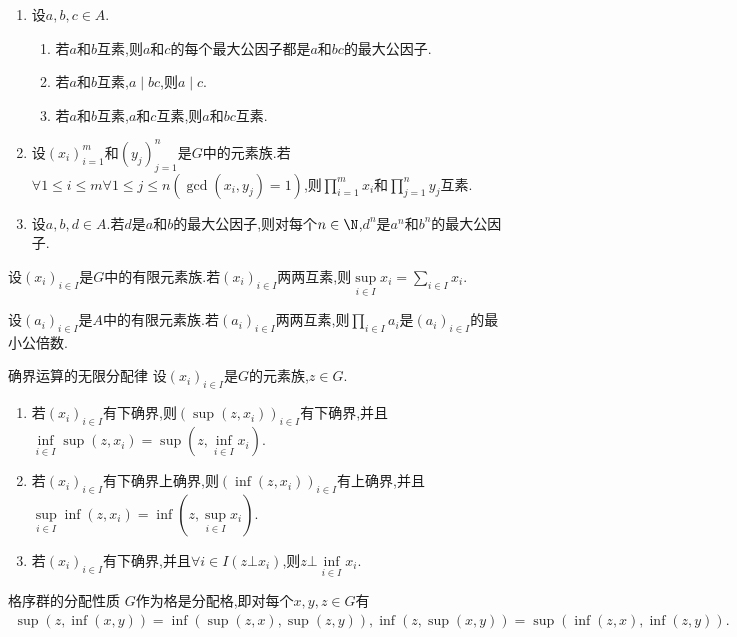 \begin{corollary}{}{}
	\begin{enumerate}
		\item 设$a,b,c\in A$.
		\begin{enumerate}
			\item 若$a$和$b$互素,则$a$和$c$的每个最大公因子都是$a$和$bc$的最大公因子.
			\item 若$a$和$b$互素,$a\mid bc$,则$a\mid c$.
			\item 若$a$和$b$互素,$a$和$c$互素,则$a$和$bc$互素.
		\end{enumerate}
		\item 设$\left(x_{i}\right)_{i=1}^{m}$和$\left(y_{j}\right)_{j=1}^{n}$是$G$中的元素族.若$\forall 1\leq i\leq m\forall 1\leq j\leq n\left(\gcd\left(x_{i},y_{j}\right)=1\right)$,则$\prod\limits_{i=1}^{m}x_{i}$和$\prod\limits_{j=1}^{n}y_{j}$互素.
		\item 设$a,b,d\in A$.若$d$是$a$和$b$的最大公因子,则对每个$n\in\N$,$d^{n}$是$a^{n}$和$b^{n}$的最大公因子.
	\end{enumerate}
\end{corollary}

\begin{proposition}{}{}
	设$\left(x_{i}\right)_{i\in I}$是$G$中的有限元素族.若$\left(x_{i}\right)_{i\in I}$两两互素,则$\sup\limits_{i\in I}x_{i}=\sum\limits_{i\in I}x_{i}$.
\end{proposition}

\begin{proposition}{}{}
	设$\left(a_{i}\right)_{i\in I}$是$A$中的有限元素族.若$\left(a_{i}\right)_{i\in I}$两两互素,则$\prod\limits_{i\in I}a_{i}$是$\left(a_{i}\right)_{i\in I}$的最小公倍数.
\end{proposition}

\begin{proposition}{确界运算的无限分配律}{}
	设$\left(x_{i}\right)_{i\in I}$是$G$的元素族,$z\in G$.
	\begin{enumerate}
		\item 若$\left(x_{i}\right)_{i\in I}$有下确界,则$\left(\sup\left(z,x_{i}\right)\right)_{i\in I}$有下确界,并且$\inf\limits_{i\in I}\sup\left(z,x_{i}\right)=\sup\left(z,\inf\limits_{i\in I}x_{i}\right)$.
		\item 若$\left(x_{i}\right)_{i\in I}$有下确界上确界,则$\left(\inf\left(z,x_{i}\right)\right)_{i\in I}$有上确界,并且$\sup\limits_{i\in I}\inf\left(z,x_{i}\right)=\inf\left(z,\sup\limits_{i\in I}x_{i}\right)$.
		\item 若$\left(x_{i}\right)_{i\in I}$有下确界,并且$\forall i\in I\left(z\bot x_{i}\right)$,则$z\bot\inf\limits_{i\in I}x_{i}$.
	\end{enumerate}
\end{proposition}

\begin{corollary}{格序群的分配性质}{}
	$G$作为格是分配格,即对每个$x,y,z\in G$有
	\begin{align*}
		\sup\left(z,\inf\left(x,y\right)\right)=\inf\left(\sup\left(z,x\right),\sup\left(z,y\right)\right),\inf\left(z,\sup\left(x,y\right)\right)=\sup\left(\inf\left(z,x\right),\inf\left(z,y\right)\right).
	\end{align*}
\end{corollary}
